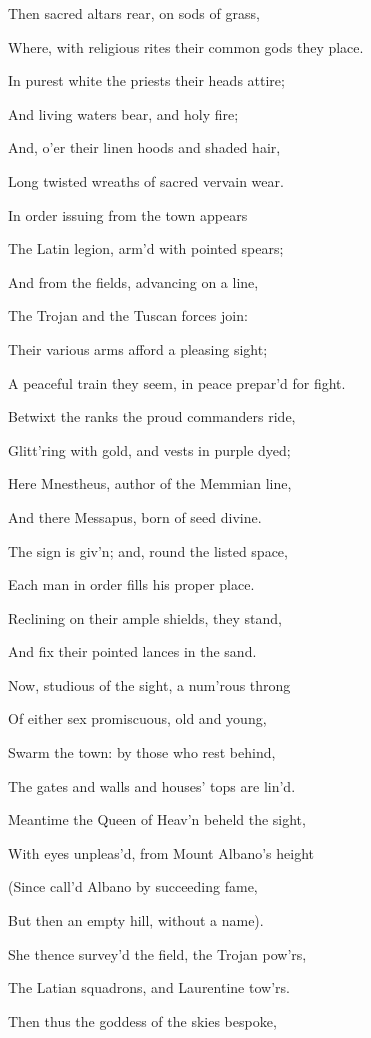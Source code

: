 Then sacred altars rear, on sods of grass,

Where, with religious rites their common gods they place.

In purest white the priests their heads attire;

And living waters bear, and holy fire;

And, o’er their linen hoods and shaded hair,

Long twisted wreaths of sacred vervain wear.

In order issuing from the town appears

The Latin legion, arm’d with pointed spears;

And from the fields, advancing on a line,

The Trojan and the Tuscan forces join:

Their various arms afford a pleasing sight;

A peaceful train they seem, in peace prepar’d for fight.

Betwixt the ranks the proud commanders ride,

Glitt’ring with gold, and vests in purple dyed;

Here Mnestheus, author of the Memmian line,

And there Messapus, born of seed divine.

The sign is giv’n; and, round the listed space,

Each man in order fills his proper place.

Reclining on their ample shields, they stand,

And fix their pointed lances in the sand.

Now, studious of the sight, a num’rous throng

Of either sex promiscuous, old and young,

Swarm the town: by those who rest behind,

The gates and walls and houses’ tops are lin’d.

Meantime the Queen of Heav’n beheld the sight,

With eyes unpleas’d, from Mount Albano’s height

(Since call’d Albano by succeeding fame,

But then an empty hill, without a name).

She thence survey’d the field, the Trojan pow’rs,

The Latian squadrons, and Laurentine tow’rs.

Then thus the goddess of the skies bespoke,

